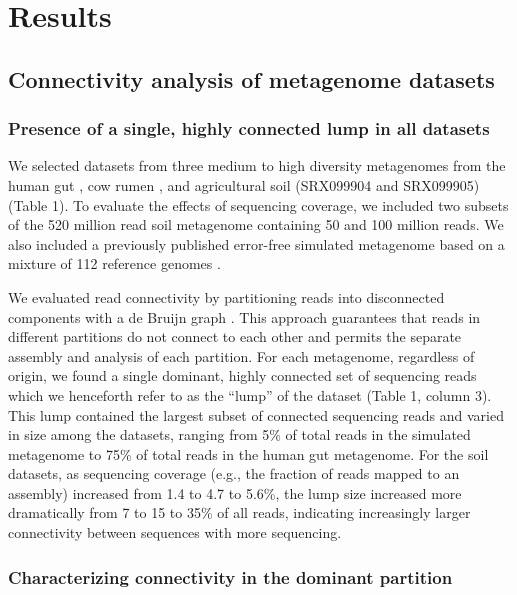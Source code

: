 \documentclass[10pt]{article}
\begin{document}
\section*{Results}

\subsection*{Connectivity analysis of metagenome datasets}

\subsubsection*{Presence of a single, highly connected lump in all datasets}
We selected datasets from three medium to high diversity
metagenomes from the human gut \cite{Qin:2010p189}, cow rumen
\cite{Hess:2011p686}, and agricultural soil (SRX099904 and SRX099905)
(Table 1).  To
evaluate the effects of sequencing coverage, we included two subsets
of the 520 million read soil metagenome containing 50 and 100 million
reads.  We also included a previously published error-free simulated
metagenome based on a mixture of 112 reference genomes
\cite{Pignatelli:2011p742}.

We evaluated read connectivity by partitioning reads into disconnected
components with a de Bruijn graph \cite{Pell:2012cq}.  This approach
guarantees that reads in different partitions do not connect to each
other and permits the separate assembly and analysis of each
partition.  For each metagenome, regardless of origin, we found a
single dominant, highly connected set of sequencing reads which we
henceforth refer to as the ``lump'' of the dataset (Table 1, column
3).  This lump contained the largest subset of connected sequencing
reads and varied in size among the datasets, ranging from 5\% of total
reads in the simulated metagenome to 75\% of total reads in the human
gut metagenome.  For the soil datasets, as sequencing coverage (e.g.,
the fraction of reads mapped to an assembly) increased from 1.4 to 4.7
to 5.6\%, the lump size increased more dramatically from 7 to 15 to
35\% of all reads, indicating increasingly larger connectivity between
sequences with more sequencing.

\subsubsection*{Characterizing connectivity in the dominant partition}
\end{document}
